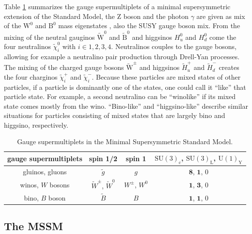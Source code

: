  Table \ref{fig:gauge_supermultiplets} summarizes the gauge supermultiplets of a minimal supersymmetric extension of the Standard Model, the Z boson and the photon $\gamma$ are given as mix of the $\text{W}^{0}$ and $\text{B}^{0}$ mass eigenstates \cite{PhysRevD.13.974}, also the SUSY gauge boson mix. From the mixing of the neutral gauginos $\widetilde{\text{W}}^{0}$ and $\widetilde{\text{B}}^{0}$ and higgsinos $H^{0}_{u}$ and $H^{0}_{d}$ come the four neutralinos $\widetilde{\chi}^{0}_{i}$ with $i \in 1,2,3,4$. Neutralinos couples to the gauge bosons, allowing for example a neutralino pair production through Drell-Yan processes. The mixing of the charged gauge bosons $\widetilde{\text{W}}^{\pm}$ and higgsinos $\widetilde{H}^{+}_{u}$ and $\widetilde{H}^{-}_{d}$ creates the four charginos $\widetilde{\chi}^{+}_{i}$ and $\widetilde{\chi}^{-}_{i}$. Because these particles are mixed states of other particles, if a particle is dominantly one of the states, one could call it “like” that particle state. For example, a second neutralino can be “winolike” if its mixed state comes mostly from the wino. “Bino-like” and “higgsino-like” describe similar situations for particles consisting of mixed states that are largely bino and higgsino, respectively.

\begin{table}[tbh!]
\centering
\begin{tabular}{|c || c | c | c |}
	\hline
	gauge supermultiplets & spin 1/2 & spin 1 & $\mathrm{SU}(3)_{\mathrm{c}}$, $\mathrm{SU}(3)_{\mathrm{L}}$, $\mathrm{U}(1)_{\mathrm{Y}}$\\\hline\hline
	gluinos, gluons & $\widetilde{g}$ & $g$ & $\mathbf{8}$, $\mathbf{1}$, 0\\\hline
	winos, $W$ bosons & $\widetilde{W}^\pm$, $\widetilde{W}^0$ & $W^\pm$, $W^0$ &   $\mathbf{1}$, $\mathbf{3}$, 0\\\hline
	bino, $B$ boson & $\widetilde{B}$ & $B$ &   $\mathbf{1}$, $\mathbf{1}$, 0\\\hline
\end{tabular}
	\caption{Gauge supermultiplets in the Minimal Supersymmetric Standard Model.}
	\label{fig:gauge_supermultiplets}
\end{table}

\FloatBarrier

\subsection{The MSSM}

\FloatBarrier

